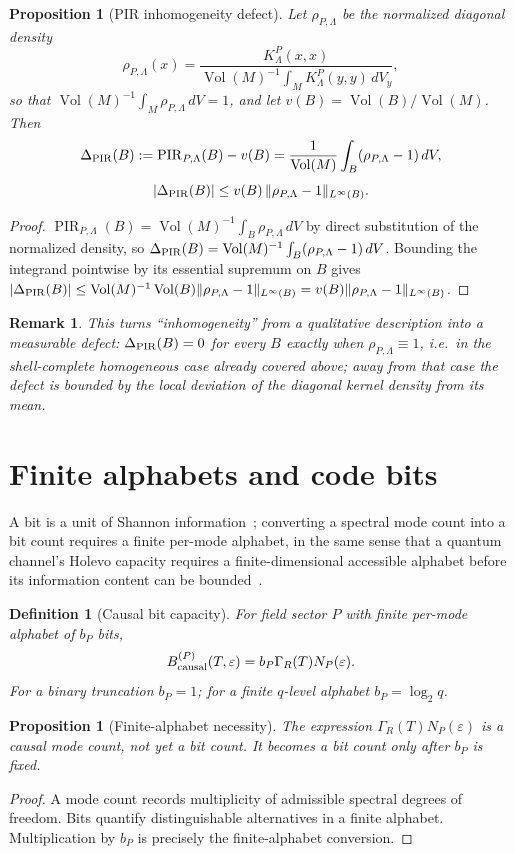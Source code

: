 \documentclass[11pt,a4paper]{article}
\newtheorem{proposition}[theorem]{Proposition}
\newtheorem{definition}[theorem]{Definition}
\newtheorem{remark}[theorem]{Remark}
\newcommand{\Vol}{\operatorname{Vol}}
\newcommand{\PIR}{\operatorname{PIR}}
\begin{document}
\begin{proposition}[PIR inhomogeneity defect]
\label{prop:pir-defect}
Let $\rho_{P,\Lambda}$ be the normalized diagonal density
\[
\rho_{P,\Lambda}(x)=\frac{K^P_\Lambda(x,x)}{\Vol(M)^{-1}\int_MK^P_\Lambda(y,y)\,dV_y},
\]
so that $\Vol(M)^{-1}\int_M\rho_{P,\Lambda}\,dV=1$, and let $v(B)=\Vol(B)/\Vol(M)$.  Then
\[
\Delta_{\rm PIR}(B):=\PIR_{P,\Lambda}(B)-v(B)=\frac{1}{\Vol(M)}\int_B(\rho_{P,\Lambda}-1)\,dV,
\]
\[
|\Delta_{\rm PIR}(B)|\le v(B)\,\|\rho_{P,\Lambda}-1\|_{L^\infty(B)}.
\]
\end{proposition}
\begin{proof}
$\PIR_{P,\Lambda}(B)=\Vol(M)^{-1}\int_B\rho_{P,\Lambda}\,dV$ by direct substitution of the normalized density, so $\Delta_{\rm PIR}(B)=\Vol(M)^{-1}\int_B(\rho_{P,\Lambda}-1)\,dV$.  Bounding the integrand pointwise by its essential supremum on $B$ gives $|\Delta_{\rm PIR}(B)|\le\Vol(M)^{-1}\Vol(B)\|\rho_{P,\Lambda}-1\|_{L^\infty(B)}=v(B)\|\rho_{P,\Lambda}-1\|_{L^\infty(B)}$.\end{proof}
\begin{remark}
This turns ``inhomogeneity'' from a qualitative description into a measurable defect: $\Delta_{\rm PIR}(B)=0$ for every $B$ exactly when $\rho_{P,\Lambda}\equiv1$, i.e.\ in the shell-complete homogeneous case already covered above; away from that case the defect is bounded by the local deviation of the diagonal kernel density from its mean.
\end{remark}

\section{Finite alphabets and code bits}

A bit is a unit of Shannon information~\cite{Shannon1948}; converting a spectral mode count into a bit count requires a finite per-mode alphabet, in the same sense that a quantum channel's Holevo capacity requires a finite-dimensional accessible alphabet before its information content can be bounded~\cite{Holevo1973}.

\begin{definition}[Causal bit capacity]
For field sector $P$ with finite per-mode alphabet of $b_P$ bits,
\[
B_{\rm causal}^{(P)}(T,\varepsilon)=b_P\Gamma_R(T)N_P(\varepsilon).
\]
For a binary truncation $b_P=1$; for a finite $q$-level alphabet $b_P=\log_2 q$.
\end{definition}

\begin{proposition}[Finite-alphabet necessity]
The expression $\Gamma_R(T)N_P(\varepsilon)$ is a causal mode count, not yet a bit count.  It becomes a bit count only after $b_P$ is fixed.
\end{proposition}
\begin{proof}
A mode count records multiplicity of admissible spectral degrees of freedom.  Bits quantify distinguishable alternatives in a finite alphabet.  Multiplication by $b_P$ is precisely the finite-alphabet conversion.\end{proof}
\end{document}

